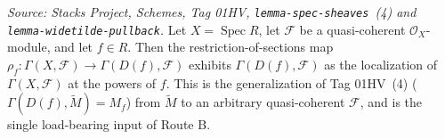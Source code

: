 \begin{lemma}
  \label{lem:qcoh_section_isLocalizedModule}
  \textit{Source: Stacks Project, Schemes, Tag 01HV, \texttt{lemma-spec-sheaves}~(4) and
  \texttt{lemma-widetilde-pullback}.}
  Let \(X = \operatorname{Spec} R\), let \(\mathcal{F}\) be a quasi-coherent
  \(\mathcal{O}_X\)-module, and let \(f \in R\). Then the restriction-of-sections map
  \(\rho_f : \Gamma(X, \mathcal{F}) \to \Gamma(D(f), \mathcal{F})\) exhibits
  \(\Gamma(D(f), \mathcal{F})\) as the localization of \(\Gamma(X, \mathcal{F})\) at the powers of
  \(f\). This is the
  generalization of Tag 01HV~(4) (\(\Gamma(D(f), \widetilde{M}) = M_f\)) from \(\widetilde{M}\) to an
  arbitrary quasi-coherent \(\mathcal{F}\), and is the single load-bearing input of Route B.
\end{lemma}
